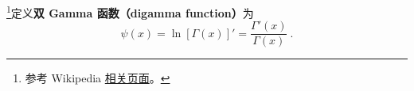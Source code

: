 
\begin{issues}
\issueDraft
\end{issues}


\footnote{参考 Wikipedia \href{https://en.wikipedia.org/wiki/Digamma_function}{相关页面}。}定义\textbf{双 Gamma 函数（digamma function）}为
\begin{equation}
\psi(x) = \ln[\Gamma(x)]' = \frac{\Gamma'(x)}{\Gamma(x)}~.
\end{equation}
